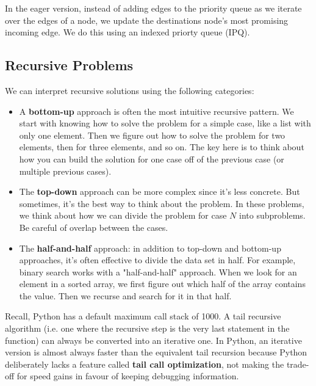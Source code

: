 \documentclass{article}
\begin{document}
    In the eager version, instead of adding edges to the priority queue as we iterate over the edges of a node, we update the destinations node's most promising incoming edge. We do this using an indexed priorty queue (IPQ).
    
    
    
    
    \subsection{Recursive Problems}
    We can interpret recursive solutions using the following categories:
    \begin{itemize}
        \item A \textbf{bottom-up} approach is often the most intuitive recursive pattern. We start with knowing how to solve the problem for a simple case, like a list with only one element. Then we figure out how to solve the problem for two elements, then for three elements, and so on. The key here is to think about how you can build the solution for one case off of the previous case (or multiple previous cases).
        
        \item The \textbf{top-down} approach can be more complex since it's less concrete. But sometimes, it's the best way to think about the problem. In these problems, we think about how we can divide the problem for case $N$ into subproblems. Be careful of overlap between the cases. 
        
        \item The \textbf{half-and-half} approach: in addition to top-down and bottom-up approaches, it's often effective to divide the data set in half. For example, binary search works with a "half-and-half" approach. When we look for an element in a sorted array, we first figure out which half of the array contains the value. Then we recurse and search for it in that half.
    \end{itemize}
    
    Recall, Python has a default maximum call stack of 1000. A tail recursive algorithm (i.e. one where the recursive step is the very last statement in the function) can always be converted into an iterative one. In Python, an iterative version is almost always faster than the equivalent tail recursion because Python deliberately lacks a feature called \textbf{tail call optimization}, not making the trade-off for speed gains in favour of keeping debugging information.
    
\end{document}

